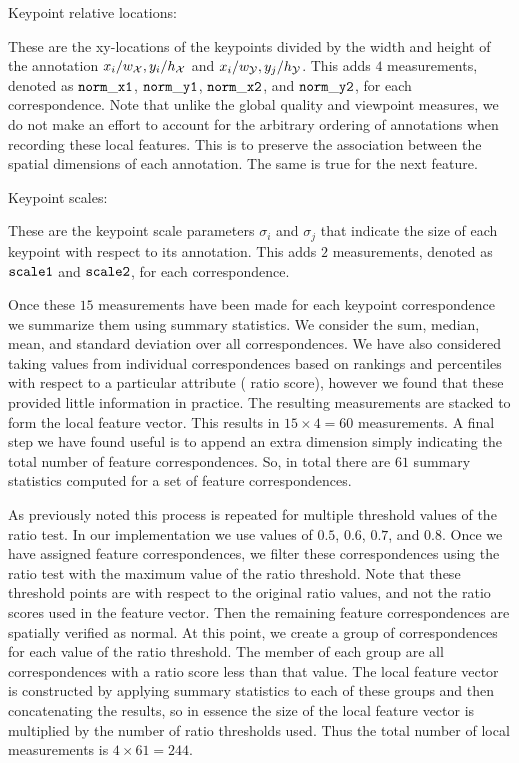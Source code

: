 \begin{itemln}
    \item Keypoint relative locations:

        These are the xy-locations of the keypoints divided by the width and height of the annotation  %
        $x_i / w_{\mathcal{X}}, y_i / h_{\mathcal{X}}$ and $x_i / w_{\mathcal{Y}}, y_j / h_{\mathcal{Y}}$.
        This adds $4$ measurements, denoted as $\tt{norm\_x1}$, $\tt{norm\_y1}$, $\tt{norm\_x2}$, and
          $\tt{norm\_y2}$, for each correspondence.
        Note that unlike the global quality and viewpoint measures, we do not make an effort to account for the
          arbitrary ordering of annotations when recording these local features.
        This is to preserve the association between the spatial dimensions of each annotation.
        The same is true for the next feature.

    \item Keypoint scales:

        These are the keypoint scale parameters $\sigma_i$ and $\sigma_j$ that indicate the size of each keypoint
          with respect to its annotation.
        This adds $2$ measurements, denoted as $\tt{scale1}$ and $\tt{scale2}$, for each correspondence.

\end{itemln}

Once these $15$ measurements have been made for each keypoint correspondence we summarize them using summary
  statistics.
We consider the sum, median, mean, and standard deviation over all correspondences.
We have also considered taking values from individual correspondences based on rankings and percentiles with
  respect to a particular attribute (\eg{} ratio score), however we found that these provided little information in
  practice.
The resulting measurements are stacked to form the local feature vector.
This results in $15 \times 4 = 60$ measurements.
A final step we have found useful is to append an extra dimension simply indicating the total number of feature
  correspondences.
So, in total there are $61$ summary statistics computed for a set of feature correspondences.

As previously noted this process is repeated for multiple threshold values of the ratio test.
In our implementation we use values of $0.5$, $0.6$, $0.7$, and $0.8$.
Once we have assigned feature correspondences, we filter these correspondences using the ratio test with the
  maximum value of the ratio threshold.
Note that these threshold points are with respect to the original ratio values, and not the ratio scores used in
  the feature vector.
Then the remaining feature correspondences are spatially verified as normal.
At this point, we create a group of correspondences for each value of the ratio threshold.
The member of each group are all correspondences with a ratio score less than that value.
The local feature vector is constructed by applying summary statistics to each of these groups and then
  concatenating the results, so in essence the size of the local feature vector is multiplied by the number of
  ratio thresholds used.
Thus the total number of local measurements is $4 \times 61 = 244$.

